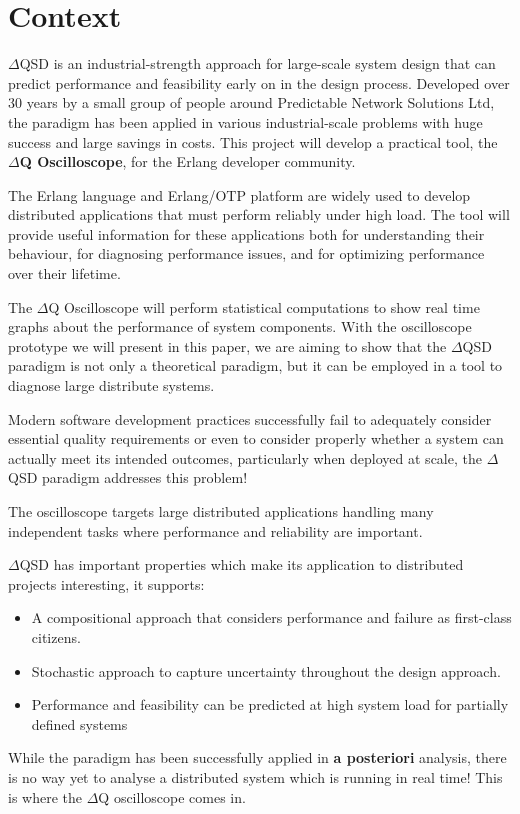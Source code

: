 \section{Context}
    $\Delta$QSD is an industrial-strength approach for large-scale system design that can predict performance and feasibility early on in the design process.  
    Developed over 30 years by a small group of people around Predictable Network Solutions Ltd, the paradigm has been applied in various industrial-scale problems with huge success and large savings in costs. \cite{dq-tut}
     This project will develop a practical tool, the \textbf{$\Delta$Q Oscilloscope}, for the Erlang developer community. 
    
    The Erlang language and Erlang/OTP platform are widely used to develop distributed applications that must perform reliably under high load. The tool will provide useful information for these applications both for understanding their behaviour, for diagnosing performance issues, and for optimizing performance over their lifetime. 
    
    The $\Delta$Q Oscilloscope will perform statistical computations to show real time graphs about the performance of system components. With the oscilloscope prototype we will present in this paper, we are aiming to show that the $\Delta$QSD paradigm is not only a theoretical paradigm, but it can be employed in a tool to diagnose large distribute systems.  

    Modern software development practices successfully fail to adequately consider essential quality requirements or even to consider properly whether a system can actually meet its intended outcomes, particularly when deployed at scale, the $\Delta$QSD paradigm addresses this problem! 
    
    The oscilloscope targets large distributed applications handling many independent tasks where performance and reliability are important. 
    
    $\Delta$QSD has important properties which make its application to distributed projects interesting, it supports:
    \begin{itemize}
        \item A compositional approach that considers performance and failure as first-class citizens. 
        \item Stochastic approach to capture uncertainty throughout the design approach.
        \item Performance and feasibility can be predicted at high system load for partially defined systems
    \end{itemize}
    
    While the paradigm has been successfully applied in \textbf{a posteriori} analysis, there is no way yet to analyse a distributed system which is running in real time! This is where the $\Delta$Q oscilloscope comes in. 
